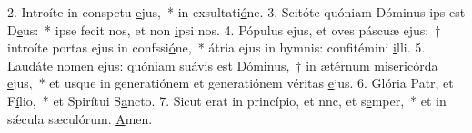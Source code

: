 2. Introíte in conspctu \uline{e}jus,~* in exsultati\uline{ó}ne.
3. Scitóte quóniam Dóminus ips est D\uline{e}us:~* ipse fecit nos, et non \uline{i}psi nos.
4. Pópulus ejus, et oves páscuæ ejus:~† introíte portas ejus in confssi\uline{ó}ne,~* átria ejus in hymnis: confitémini \uline{i}lli.
5. Laudáte nomen ejus: quóniam suávis est Dóminus,~† in ætérnum misericórda \uline{e}jus,~* et usque in generatiónem et generatiónem véritas \uline{e}jus.
6. Glória Patr, et F\uline{í}lio,~* et Spirítui S\uline{a}ncto.
7. Sicut erat in princípio, et nnc, et s\uline{e}mper,~* et in sǽcula sæculórum. \uline{A}men.
